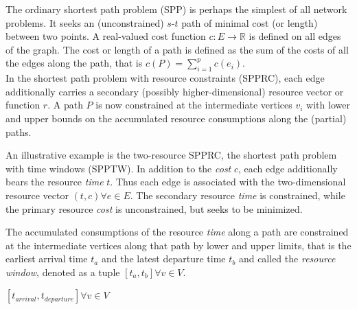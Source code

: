The ordinary shortest path problem (SPP) is perhaps the simplest of all network problems. It seeks an (unconstrained) $s$-$t$ path of minimal cost (or length) between two points. A real-valued cost function $c : E \rightarrow \mathbb{R}$ is defined on all edges of the graph. The cost or length of a path is defined as the sum of the costs of all the edges along the path, that is $c(P)=\sum_{i=1}^p c(e_i)$. \\



In the shortest path problem with resource constraints (SPPRC), each edge additionally carries a secondary (possibly higher-dimensional) resource vector or function $r$. A path $P$ is now constrained at the intermediate vertices $v_i$ with lower and upper bounds on the accumulated resource consumptions along the (partial) paths.\\

\begin{example}[SPPTW]
An illustrative example is the two-resource SPPRC, the shortest path problem with time windows (SPPTW). In addition to the \textit{cost} $c$, each edge additionally bears the resource \textit{time} $t$. Thus each edge is associated with the two-dimensional resource vector $(t,c) \forall e \in E$. The secondary resource \textit{time} is constrained, while the primary resource \textit{cost} is unconstrained, but seeks to be minimized.

The accumulated consumptions of the resource \textit{time} along a path are constrained at the intermediate vertices along that path by lower and upper limits, that is the earliest arrival time $t_a$ and the latest departure time $t_b$ and called the \textit{resource window}, denoted as a tuple $[t_a,t_b] \forall v \in V$.
\end{example}

$[t_{arrival},t_{departure}] \forall v \in V$


